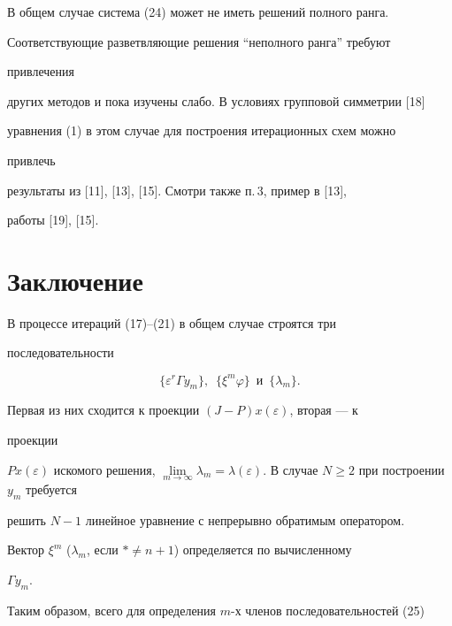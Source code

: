 \begin{note}


В общем случае система (24) может не иметь решений полного ранга.


Соответствующие разветвляющие решения ``неполного ранга'' требуют


привлечения


других методов и пока изучены слабо. В условиях групповой симметрии [18]


уравнения (1) в этом случае для построения итерационных схем можно


привлечь


результаты из [11], [13], [15]. Смотри также п.\,3, пример в [13],


работы [19], [15].


\end{note}





\section*{Заключение}





В процессе итераций (17)--(21) в общем случае строятся три


последовательности


\begin{equation}


\{\varepsilon^r\Gamma y_m\}, \ \; \{\xi^m\varphi\}\ \; \text{и}\ \;


\{\lambda_m\}.


\end{equation}


Первая из них сходится к проекции $(J-P)x(\varepsilon)$, вторая --- к


проекции


$Px(\varepsilon)$ искомого решения, $\lim\limits_{m\to\infty}\lambda_m =


\lambda(\varepsilon)$. В случае $N \ge 2$ при построении $y_m$ требуется


решить $N-1$  линейное уравнение с непрерывно обратимым оператором.


Вектор $\xi^m$ ($\lambda_m$, если $*\ne n+1$) определяется по вычисленному


$\Gamma y_m$.


Таким образом, всего для определения $m$-х членов последовательностей (25)


